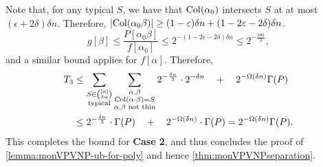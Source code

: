 Note that, for any typical $S$, we have that $\operatorname{Col}(\alpha_0)$ intersects $S$ at at most $(\epsilon + 2\delta)\delta n$. Therefore, $\left|\operatorname{Col}(\alpha_0 \beta)\right| \geq (1 - \varepsilon)\delta n + (1 - 2\varepsilon -2\delta)\delta n$. 
\[
  g[\beta] \leq \frac{P[\alpha_0 \beta]}{f[\alpha_0]} \leq 2^{-(1 - 2\epsilon - 2\delta)\delta n} \leq 2^{-\frac{2\delta n}{3}},
\]
and a similar bound applies for $f[\alpha]$. Therefore,
\begin{align*}
  T_3 & \leq \sum_{\substack{S \in \binom{[n]}{\delta n}\\\text{typical}}} \sum_{\substack{\alpha, \beta\\ \operatorname{Col}(\alpha \cdot \beta) = S \\ \text{$\alpha$,$\beta$ not thin}}} 2^{-\frac{\delta n}{3}}\cdot 2^{-\delta n} \quad+\quad 2^{-\Omega(\delta n)} \Gamma(P)\\
  & \leq 2^{-\frac{\delta n}{3}} \cdot \Gamma(P) \quad + \quad 2^{-\Omega(\delta n)}\cdot \Gamma(P) = 2^{-\Omega(\delta n)} \Gamma(P).
\end{align*}
This completes the bound for {\bf Case 2}, and thus concludes the proof of \autoref{lemma:monVPVNP-ub-for-poly} and hence \autoref{thm:monVPVNPseparation}.


